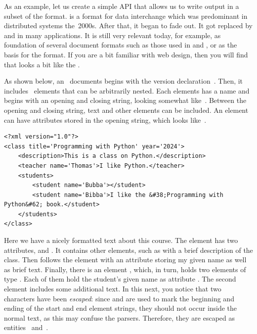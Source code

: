 As an example, let us create a simple API that allows us to write output in a subset of the  format.
 is a format for data interchange which was predominant in distributed systems the~2000s.
After that, it began to fade out.
It got replaced  by  and  in many applications.
It is still very relevant today, for example, as foundation of several document formats such as those used in \libreoffice{} and \microsoftWord{}, or as the basis for the  format.
If you are a bit familiar with web design, then you will find that  looks a bit like the .%
%
\begin{sloppypar}%
As shown below, an ~documents begins with the  version declaration~.
Then, it includes ~elements that can be arbitrarily nested.
Each elements has a name and begins with an opening and closing string, looking somewhat like~.
Between the opening and closing string, text and other elements can be included.
An element can have attributes stored in the opening string, which looks like~.%
\end{sloppypar}%
%
\begin{center}
\begin{minipage}{\linewidth}%
\begin{lstlisting}[style=xml_style]
<?xml version="1.0"?>
<class title='Programming with Python' year='2024'>
    <description>This is a class on Python.</description>
    <teacher name='Thomas'>I like Python.</teacher>
    <students>
        <student name='Bubba'></student>
        <student name='Bibba'>I like the &#38;Programming with Python&#62; book.</student>
    </students>
</class>
\end{lstlisting}%
\end{minipage}%
\end{center}%
%
Here we have a nicely formatted  text about this course.
The  element has two attributes,  and .
It contains other elements, such as  with a brief description of the class.
Then follows the element  with an attribute storing my given name as well as brief text.
Finally, there is an element , which, in turn, holds two elements of type .
Each of them hold the student's given name as attribute .
The second  element includes some additional text.
In this next, you notice that two characters have been \emph{escaped}: since \textil{<} and \textil{>} are used to mark the beginning and ending of the start and end element strings, they should not occur inside the normal text, as this may confuse the  parsers.
Therefore, they are escaped as entities~ and~.


